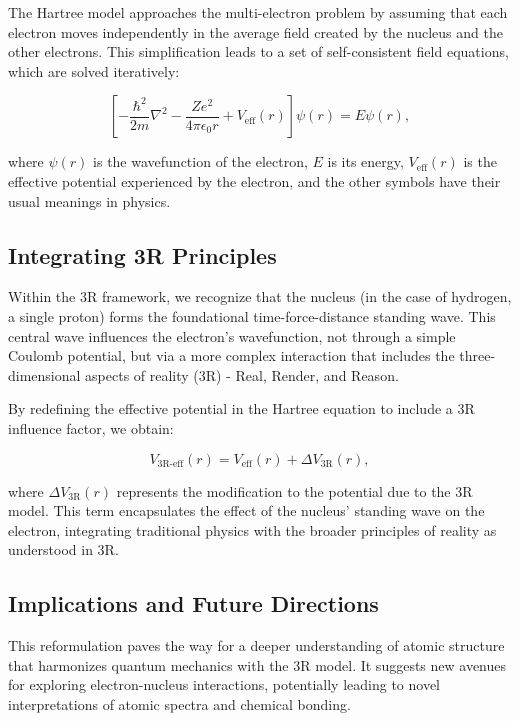 \documentclass[12pt]{article}
\begin{document}
The Hartree model approaches the multi-electron problem by assuming that each electron moves independently in the average field created by the nucleus and the other electrons. This simplification leads to a set of self-consistent field equations, which are solved iteratively:

\begin{equation}
    \left [ -\frac{\hbar^2}{2m}\nabla^2 - \frac{Ze^2}{4\pi\epsilon_0 r} + V_{\text{eff}}(r) \right ]\psi(r) = E\psi(r),
\end{equation}

where $\psi(r)$ is the wavefunction of the electron, $E$ is its energy, $V_{\text{eff}}(r)$ is the effective potential experienced by the electron, and the other symbols have their usual meanings in physics.

\subsection{Integrating 3R Principles}

Within the 3R framework, we recognize that the nucleus (in the case of hydrogen, a single proton) forms the foundational time-force-distance standing wave. This central wave influences the electron's wavefunction, not through a simple Coulomb potential, but via a more complex interaction that includes the three-dimensional aspects of reality (3R) - Real, Render, and Reason.

By redefining the effective potential in the Hartree equation to include a 3R influence factor, we obtain:

\begin{equation}
    V_{\text{3R-eff}}(r) = V_{\text{eff}}(r) + \Delta V_{\text{3R}}(r),
\end{equation}

where $\Delta V_{\text{3R}}(r)$ represents the modification to the potential due to the 3R model. This term encapsulates the effect of the nucleus' standing wave on the electron, integrating traditional physics with the broader principles of reality as understood in 3R.

\subsection{Implications and Future Directions}

This reformulation paves the way for a deeper understanding of atomic structure that harmonizes quantum mechanics with the 3R model. It suggests new avenues for exploring electron-nucleus interactions, potentially leading to novel interpretations of atomic spectra and chemical bonding.
\end{document}
